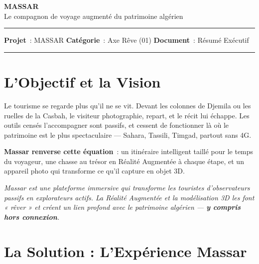 \documentclass[11pt,a4paper]{article}
\newcommand{\hrulethin}{\vspace{-0.7em}\par\noindent{\color{accent}\rule{\linewidth}{0.5pt}}\par\vspace{-0.45em}}
\begin{document}
{\Huge\bfseries\color{accent} MASSAR}\\[0.2em]
{\large Le compagnon de voyage augmenté du patrimoine algérien}

\vspace{0.4em}
{\color{accent}\rule{\linewidth}{1.2pt}}
\vspace{-0.4em}

\textbf{Projet}~: MASSAR \hfill \textbf{Catégorie}~: Axe Rêve (01) \hfill \textbf{Document}~: Résumé Exécutif

{\color{accent}\rule{\linewidth}{0.5pt}}

\section{L'Objectif et la Vision}\hrulethin

Le tourisme se regarde plus qu'il ne se vit. Devant les colonnes de Djemila ou les ruelles de la Casbah, le visiteur photographie, repart, et le récit lui échappe. Les outils censés l'accompagner sont passifs, et cessent de fonctionner là où le patrimoine est le plus spectaculaire — Sahara, Tassili, Timgad, partout sans 4G.

\textbf{Massar renverse cette équation}~: un itinéraire intelligent taillé pour le temps du voyageur, une chasse au trésor en Réalité Augmentée à chaque étape, et un appareil photo qui transforme ce qu'il capture en objet 3D.

\textit{Massar est une plateforme immersive qui transforme les touristes d'observateurs passifs en explorateurs actifs. La Réalité Augmentée et la modélisation 3D les font « rêver » et créent un lien profond avec le patrimoine algérien — \textbf{y compris hors connexion}.}

\section{La Solution : L'Expérience Massar}\hrulethin
\end{document}
